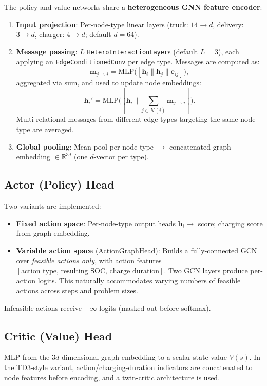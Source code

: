 \documentclass[11pt]{article}
\begin{document}
The policy and value networks share a \textbf{heterogeneous GNN feature encoder}:
\begin{enumerate}[nosep]
    \item \textbf{Input projection}: Per-node-type linear layers (truck: $14\!\to\!d$, delivery: $3\!\to\!d$, charger: $4\!\to\!d$; default $d=64$).
    \item \textbf{Message passing}: $L$ \texttt{HeteroInteractionLayer}s (default $L=3$), each applying an \texttt{EdgeConditionedConv} per edge type. Messages are computed as:
    \[
    \mathbf{m}_{j\to i} = \text{MLP}\big([\mathbf{h}_i \| \mathbf{h}_j \| \mathbf{e}_{ij}]\big),
    \]
    aggregated via sum, and used to update node embeddings:
    \[
    \mathbf{h}_i' = \text{MLP}\big([\mathbf{h}_i \| \textstyle\sum_{j\in\mathcal{N}(i)} \mathbf{m}_{j\to i}]\big).
    \]
    Multi-relational messages from different edge types targeting the same node type are averaged.
    \item \textbf{Global pooling}: Mean pool per node type $\to$ concatenated graph embedding $\in\mathbb{R}^{3d}$ (one $d$-vector per type).
\end{enumerate}

\subsection{Actor (Policy) Head}

Two variants are implemented:
\begin{itemize}[nosep]
    \item \textbf{Fixed action space}: Per-node-type output heads $\mathbf{h}_i \mapsto$ score; charging score from graph embedding.
    \item \textbf{Variable action space} (ActionGraphHead): Builds a fully-connected GCN over \emph{feasible actions only}, with action features $[\text{action\_type},\, \text{resulting\_SOC},\, \text{charge\_duration}]$. Two GCN layers produce per-action logits. This naturally accommodates varying numbers of feasible actions across steps and problem sizes.
\end{itemize}
Infeasible actions receive $-\infty$ logits (masked out before softmax).

\subsection{Critic (Value) Head}

MLP from the $3d$-dimensional graph embedding to a scalar state value $V(s)$. In the TD3-style variant, action/charging-duration indicators are concatenated to node features before encoding, and a twin-critic architecture is used.
\end{document}
